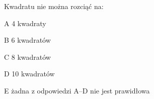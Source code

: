 \begin{tresc}
Kwadratu nie można rozciąć na:
\end{tresc}
\begin{wariant}{A} 4 kwadraty \end{wariant}
\begin{wariant}{B} 6 kwadratów \end{wariant}
\begin{wariant}{C} 8 kwadratów \end{wariant}
\begin{wariant}{D} 10 kwadratów \end{wariant}
\begin{wariant}{E} żadna z odpowiedzi A–D nie jest prawidłowa \end{wariant}
